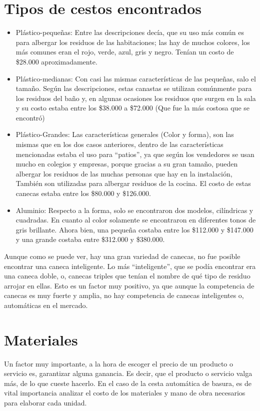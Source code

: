 \documentclass{report}
\begin{document}
    \section{Tipos de cestos encontrados}
        \begin{itemize}
        \item Plástico-pequeñas: Entre las descripciones decía, que su uso más común es para albergar los residuos de las habitaciones; las hay de muchos colores, los más comunes eran el rojo, verde, azul, gris y negro. Tenían un costo de \$28.000 aproximadamente.

        \item Plástico-medianas: Con casi las mismas características de las pequeñas, salo el tamaño. Según las descripciones, estas canastas se utilizan comúnmente para los residuos del baño y, en algunas ocasiones los residuos que surgen en la sala y su costo estaba entre los \$38.000 a \$72.000 (Que fue la más costosa que se encontró)

        \item Plástico-Grandes: Las características generales (Color y forma), son las mismas que en los dos casos anteriores, dentro de las características mencionadas estaba el uso para “patios”, ya que según los vendedores se usan mucho en colegios y empresas, porque gracias a su gran tamaño, pueden albergar los residuos de las muchas personas que hay en la instalación, También son utilizadas para albergar residuos de la cocina. El costo de estas canecas estaba entre los \$80.000 y \$126.000.

        \item Aluminio: Respecto a la forma, solo se encontraron dos modelos, cilíndricas y cuadradas. En cuanto al color solamente se encontraron en diferentes tonos de gris brillante. Ahora bien, una pequeña costaba entre los \$112.000 y \$147.000 y una grande costaba entre \$312.000 y \$380.000.


        \end{itemize}

    Aunque como se puede ver, hay una gran variedad de canecas, no fue posible encontrar una caneca inteligente. Lo más “inteligente”, que se podía encontrar era una caneca doble, o, canecas triples que tenían el nombre de qué tipo de residuo arrojar en ellas. Esto es un factor muy positivo, ya que aunque la competencia de canecas es muy fuerte y amplia, no hay competencia de canecas inteligentes o, automáticas en el mercado.

    \section{Materiales}
    Un factor muy importante, a la hora de escoger el precio de un producto o servicio es, garantizar alguna ganancia. Es decir, que el producto o servicio valga más, de lo que cueste hacerlo. En el caso de la cesta automática de basura, es de vital importancia analizar el costo de los materiales y mano de obra necesarios para elaborar cada unidad.
\end{document}
